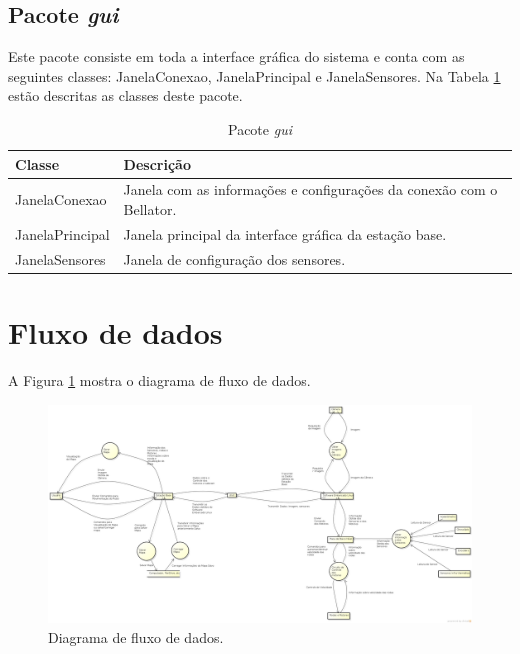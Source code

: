 \subsection{Pacote \textit{gui}}

Este pacote consiste em toda a interface gráfica do sistema e conta com as seguintes classes: JanelaConexao, JanelaPrincipal e JanelaSensores. Na Tabela \ref{tab:pacote_interface_grafica} estão descritas as classes deste pacote.

\begin{table}[h]
  \centering
  \caption{Pacote \textit{gui}}
  \begin{tabular}{p{6cm}p{8cm}}
    \toprule
    \textbf{Classe} & \textbf{Descrição} \\ 
    \midrule
    JanelaConexao & Janela com as informações e configurações da conexão com o Bellator. \\ \hline
    JanelaPrincipal & Janela principal da interface gráfica da estação base. \\ \hline
    JanelaSensores & Janela de configuração dos sensores. \\ 
    \bottomrule
  \end{tabular}%
  \label{tab:pacote_interface_grafica}%
\end{table}%

\section{Fluxo de dados}

A Figura \ref{fig:diagrama_fluxo_dados} mostra o diagrama de fluxo de dados.

\begin{figure}[H]
  \centering
  \includegraphics[width=\textwidth, keepaspectratio]{./figuras/diagrama_fluxo_dados.png}
  \caption{Diagrama de fluxo de dados.}
  \label{fig:diagrama_fluxo_dados}
\end{figure}

